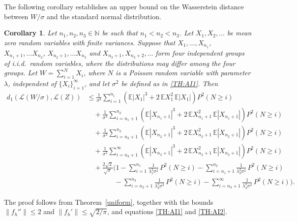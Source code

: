 \documentclass[pdflatex,sn-mathphys-ay]{sn-jnl}
\newcommand{\nn}{\nonumber}
\newtheorem{corollary}[theorem]{Corollary}
\theoremstyle{thmstyleone}%
\theoremstyle{thmstyletwo}%
\theoremstyle{thmstylethree}%
\begin{document}
	The following corollary establishes an upper bound on the Wasserstein distance between $W/\sigma$ and the standard normal distribution.
		\begin{corollary} \label{Cor: ChatGPT} 
 Let $n_1, n_2, n_3\in \mathbb{N}$ be such that $n_1< n_2< n_3$. Let $X_1,X_2,\ldots$ be mean zero random variables with finite variances.
Suppose that
$X_1,\ldots,X_{n_1}$, $X_{n_1+1},\ldots X_{n_2}$, $X_{n_2+1},\ldots X_{n_3}$    and  $X_{n_3+1}, X_{n_3+2}, \ldots $ 
form four independent groups of i.i.d.\ random variables, where the distributions may differ among the four groups. Let $W=\sum_{i=1}^N X_i$, where $N$ is a Poisson random variable  with parameter $\lambda$, independent of $\{X_i\}_{i=1}^\infty$, and let
 $\sigma^2$ be defined as in \eqref{TH:AI1}. Then
			\begin{align}\label{Cor:Chatgt}
				d_1\!\left(\mathcal{L}(W/\sigma), \mathcal{L}(Z) \right)
				&\le \frac{1}{\sigma^3} \sum_{i=1}^{n_{1}} 
				\left(\mathbb{E}|X_1|^3 + 2\,\mathbb{E} X_1^2 \,\mathbb{E}|X_1|\right) P^2(N \ge i) \nn\\[4pt]
				&\quad + \frac{1}{\sigma^3} \sum_{i=n_{1}+1}^{n_2} 
				\left(\mathbb{E}|X_{n_{1}+1}|^3 + 2\,\mathbb{E} X_{n_{1}+1}^2  \,\mathbb{E}|X_{n_{1}+1}|\right) P^2(N \ge i)\nn \\[4pt]
				&\quad + \frac{1}{\sigma^3} \sum_{i=n_{2}+1}^{n_3} 
				\left(\mathbb{E}|X_{n_{2}+1}|^3 + 2\,\mathbb{E} X_{n_{2}+1}^2  \,\mathbb{E}|X_{n_{2}+1}|\right) P^2(N \ge i)\nn \\[4pt]
				&\quad + \frac{1}{\sigma^3} \sum_{i=n_{3}+1}^{\infty} 
				\left(\mathbb{E}|X_{n_{3}+1}|^3 + 2\,\mathbb{E} X_{n_{3}+1}^2  \,\mathbb{E}|X_{n_{3}+1}|\right) P^2(N \ge i) \nn\\[4pt]
				&\quad + \frac{2\sqrt{2}}{\sqrt{\pi}} 
				\Bigg(1 -\sum_{i=1}^{n_1}\frac{1}{\lambda^2_1\sigma^2} \, {P}^2(N \ge i) -\sum_{i=n_1+1}^{n_2}\frac{1}{\lambda^2_2\sigma^2} \, {P}^2(N \ge i)\nn\\&\quad\quad\quad\quad  -\sum_{i=n_2+1}^{n_3}\frac{1}{\lambda^2_3\sigma^2} \, {P}^2(N \ge i)-\sum_{i=n_3+1}^{\infty}\frac{1}{\lambda^2_4\sigma^2} \, {P}^2(N \ge i)\Bigg).
			\end{align}
		\end{corollary}
		\proof The proof follows from Theorem~\ref{uniform}, together with the bounds
			$\|f_h''\| \le 2$ and $\|f_h'\| \le \sqrt{2/\pi}$, and equations \eqref{TH:AI1} and \eqref{TH:AI2}. 
\end{document}

